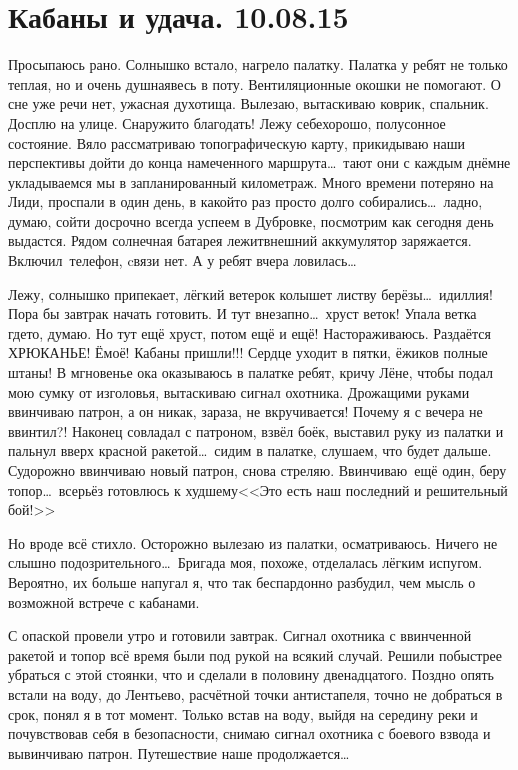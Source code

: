 \chapter{Кабаны и удача. 10.08.15}

Просыпаюсь рано. Солнышко встало, нагрело палатку. Палатка у ребят не только теплая, но и очень душная\mdash весь в поту. Вентиляционные окошки не помогают. О сне уже речи нет, ужасная духотища. Вылезаю, вытаскиваю коврик, спальник. Досплю на улице. Снаружи\sdash то благодать! Лежу себе\mdash хорошо, полусонное состояние. Вяло рассматриваю топографическую карту, прикидываю наши перспективы дойти до конца намеченного маршрута\ldots~тают они с каждым днём\mdash не укладываемся мы в запланированный километраж. Много времени потеряно на Лиди, проспали в один день, в какой\sdash то раз просто долго собирались\ldots~ладно, думаю, сойти досрочно всегда успеем в Дубровке, посмотрим как сегодня день выдастся. Рядом солнечная батарея лежит\mdash внешний аккумулятор заряжается. Включил~телефон, cвязи нет. А у ребят вчера ловилась\ldots 

Лежу, солнышко припекает, лёгкий ветерок колышет листву берёзы\ldots~идиллия! Пора бы завтрак начать готовить. И тут внезапно\ldots~хруст веток! Упала ветка где\sdash то, думаю. Но тут ещё хруст, потом ещё и ещё! Настораживаюсь. Раздаётся ХРЮКАНЬЕ! Ё\sdash моё! Кабаны пришли!!! Сердце уходит в пятки, ёжиков полные штаны! В мгновенье ока оказываюсь в палатке ребят, кричу Лёне, чтобы подал мою сумку от изголовья, вытаскиваю сигнал охотника. Дрожащими руками ввинчиваю патрон, а он никак, зараза, не вкручивается! Почему я с вечера не ввинтил?! Наконец совладал с патроном, взвёл боёк, выставил руку из палатки и пальнул вверх красной ракетой\ldots~сидим в палатке, слушаем, что будет дальше. Судорожно ввинчиваю новый патрон, снова стреляю. Ввинчиваю~ещё один, беру топор\ldots~всерьёз готовлюсь к худшему\mdash <<Это есть наш последний и решительный бой!>> 

Но вроде всё стихло. Осторожно вылезаю из палатки, осматриваюсь. Ничего не слышно подозрительного\ldots~Бригада моя, похоже, отделалась лёгким испугом. Вероятно, их больше напугал я, что так беспардонно разбудил, чем мысль о возможной встрече с кабанами.

С опаской провели утро и готовили завтрак. Сигнал охотника с ввинченной ракетой и топор всё время были под рукой на всякий случай. Решили побыстрее убраться с этой стоянки, что и сделали в половину двенадцатого. Поздно опять встали на воду, до Лентьево, расчётной точки антистапеля, точно не добраться в срок, понял я в тот момент. Только встав на воду, выйдя на середину реки и почувствовав себя в безопасности, снимаю сигнал охотника с боевого взвода и вывинчиваю патрон. Путешествие наше продолжается\ldots~
 
